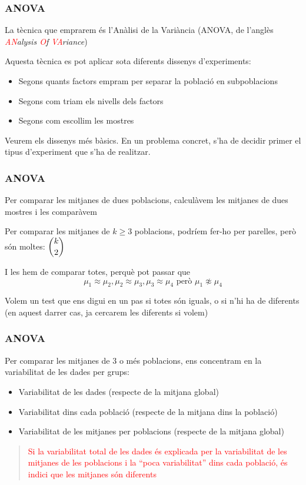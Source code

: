 \documentclass[12pt,t]{beamer}
\newcommand{\red}[1]{\textcolor{red}{#1}}
\renewcommand{\emph}[1]{{\color{red}#1}}
\renewcommand{\geq}{\geqslant}
\theoremstyle{plain}
\theoremstyle{definition}
\begin{document}
\begin{frame}
\frametitle{ANOVA}
La tècnica que emprarem és l'\emph{Anàlisi de la Variància} (\emph{ANOVA}, de l'anglès \textsl{\red{AN}alysis \red{O}f \red{VA}riance})
\bigskip

Aquesta tècnica es pot aplicar sota diferents dissenys d'experiments:
\begin{itemize}
\item Segons quants factors empram per separar la població en subpoblacions
\medskip

\item Segons com triam els nivells dels factors
\medskip

\item Segons com escollim les mostres
\end{itemize}
\medskip

Veurem els dissenys més bàsics. En un problema concret, s'ha de decidir primer el tipus d'experiment que s'ha de realitzar.

\end{frame}



\begin{frame}
\frametitle{ANOVA}

Per comparar les mitjanes de dues poblacions,  calculàvem les mitjanes de dues mostres i les comparàvem
\medskip

Per comparar les mitjanes de $k\geq 3$ poblacions, podríem fer-ho per parelles, però són moltes: $\dbinom{k}{2}$
\medskip

I les hem de comparar totes, perquè pot passar que
$$
\mu_1\approx \mu_2, \mu_2\approx \mu_3, \mu_3\approx\mu_4\mbox{ però }
\mu_1\not\approx \mu_4
$$
\medskip

Volem un test que ens digui en un pas si totes són iguals, o si n'hi ha de diferents (en aquest darrer cas, ja cercarem les diferents si volem)
\end{frame}


\begin{frame}
\frametitle{ANOVA}

Per comparar les mitjanes de 3 o més poblacions, ens concentram en la variabilitat de les dades per grups:
\medskip

\begin{itemize}
\item Variabilitat de les dades (respecte de la mitjana global)
\medskip

\item Variabilitat dins cada població (respecte de la mitjana dins la població)
\medskip

\item Variabilitat de les mitjanes per poblacions (respecte de la mitjana global)
\medskip
\end{itemize}

\begin{quote}
\red{Si la variabilitat total de les dades és explicada per la variabilitat de les mitjanes de les poblacions i  la ``poca variabilitat'' dins cada població, és indici que les mitjanes són diferents}
\end{quote}
\end{frame}
\end{document}
